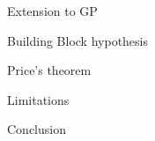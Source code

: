 \begin{frame}{Extension to GP}
\end{frame}

\begin{frame}{Building Block hypothesis}
\end{frame}

\begin{frame}{Price's theorem}
\end{frame}

\begin{frame}{Limitations}
\end{frame}

\begin{frame}{Conclusion}
\end{frame}
